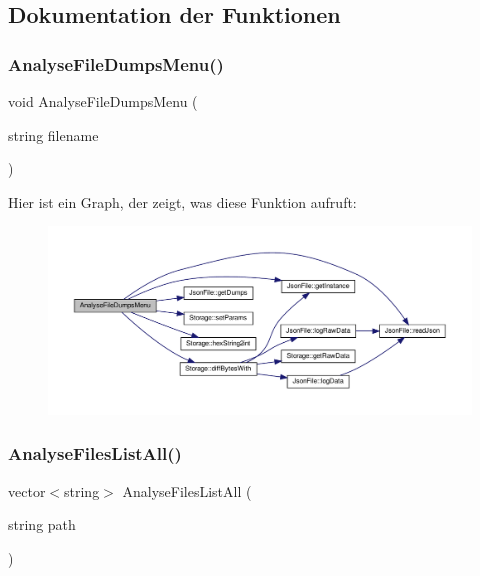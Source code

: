 \subsection{Dokumentation der Funktionen}
\mbox{\label{_jura_coffee_memory_8cpp_ab8bde046af6922695656d5315eb4850a}} 
\subsubsection{Analyse\+File\+Dumps\+Menu()}
{\footnotesize\ttfamily void Analyse\+File\+Dumps\+Menu (\begin{DoxyParamCaption}\item[{string}]{filename }\end{DoxyParamCaption})}

Hier ist ein Graph, der zeigt, was diese Funktion aufruft\+:
\nopagebreak
\begin{figure}[H]
\begin{center}
\leavevmode
\includegraphics[width=350pt]{_jura_coffee_memory_8cpp_ab8bde046af6922695656d5315eb4850a_cgraph}
\end{center}
\end{figure}
\mbox{\label{_jura_coffee_memory_8cpp_af65003482ad2efc684f1bf59133d1b71}} 
\subsubsection{Analyse\+Files\+List\+All()}
{\footnotesize\ttfamily vector$<$string$>$ Analyse\+Files\+List\+All (\begin{DoxyParamCaption}\item[{string}]{path }\end{DoxyParamCaption})}

